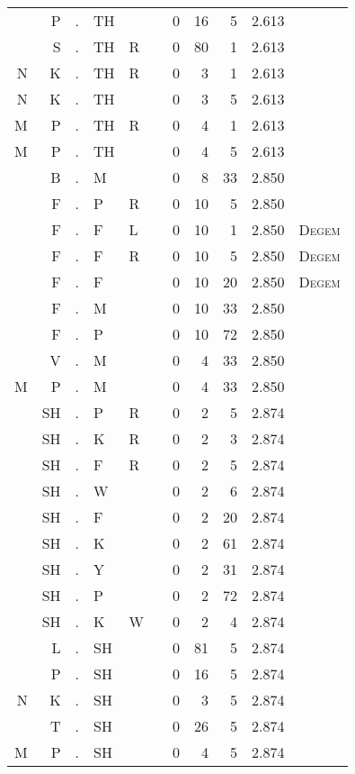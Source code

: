 \begin{longtable}{r@{ } r@{ } c@{ } l@{ } l@{ } l@{ } r r r r l }
  & P & . & TH &   &   & 0 & 16 & 5 & 2.613 &  \\
  & S & . & TH & R &   & 0 & 80 & 1 & 2.613 &  \\
N & K & . & TH & R &   & 0 & 3 & 1 & 2.613 &  \\
N & K & . & TH &   &   & 0 & 3 & 5 & 2.613 &  \\
M & P & . & TH & R &   & 0 & 4 & 1 & 2.613 &  \\
M & P & . & TH &   &   & 0 & 4 & 5 & 2.613 &  \\
  & B & . & M &   &   & 0 & 8 & 33 & 2.850 &  \\
  & F & . & P & R &   & 0 & 10 & 5 & 2.850 &  \\
  & F & . & F & L &   & 0 & 10 & 1 & 2.850 & \textsc{Degem} \\
  & F & . & F & R &   & 0 & 10 & 5 & 2.850 & \textsc{Degem} \\
  & F & . & F &   &   & 0 & 10 & 20 & 2.850 & \textsc{Degem} \\
  & F & . & M &   &   & 0 & 10 & 33 & 2.850 &  \\
  & F & . & P &   &   & 0 & 10 & 72 & 2.850 &  \\
  & V & . & M &   &   & 0 & 4 & 33 & 2.850 &  \\
M & P & . & M &   &   & 0 & 4 & 33 & 2.850 &  \\
  & SH & . & P & R &   & 0 & 2 & 5 & 2.874 &  \\
  & SH & . & K & R &   & 0 & 2 & 3 & 2.874 &  \\
  & SH & . & F & R &   & 0 & 2 & 5 & 2.874 &  \\
  & SH & . & W &   &   & 0 & 2 & 6 & 2.874 &  \\
  & SH & . & F &   &   & 0 & 2 & 20 & 2.874 &  \\
  & SH & . & K &   &   & 0 & 2 & 61 & 2.874 &  \\
  & SH & . & Y &   &   & 0 & 2 & 31 & 2.874 &  \\
  & SH & . & P &   &   & 0 & 2 & 72 & 2.874 &  \\
  & SH & . & K & W &   & 0 & 2 & 4 & 2.874 &  \\
  & L & . & SH &   &   & 0 & 81 & 5 & 2.874 &  \\
  & P & . & SH &   &   & 0 & 16 & 5 & 2.874 &  \\
N & K & . & SH &   &   & 0 & 3 & 5 & 2.874 &  \\
  & T & . & SH &   &   & 0 & 26 & 5 & 2.874 &  \\
M & P & . & SH &   &   & 0 & 4 & 5 & 2.874 &  \\

\end{longtable}
